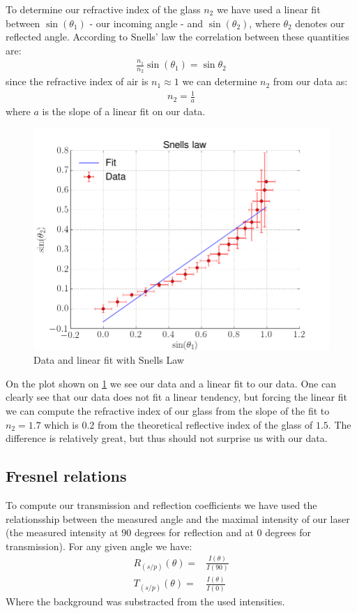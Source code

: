 To determine our refractive index of the glass $n_2$ we have used a linear fit between $\sin(\theta_1)$ - our incoming angle - and $\sin(\theta_2)$, where $\theta_2$ denotes our reflected angle. According to Snells' law the correlation between these quantities are:
%
\begin{align}
\frac{n_1}{n_2}\sin(\theta_1)=\sin{\theta_2}
\end{align}
%
since the refractive index of air is $n_1 \approx 1$ we can determine $n_2$ from our data as:
%
\begin{align}
n_2=\frac{1}{a}
\end{align}
%
where $a$ is the slope of a linear fit on our data. 
\begin{figure}[h!]
    \centering
    \includegraphics[width=\columnwidth]{snell}
    \caption{Data and linear fit with Snells Law}
    \label{fig:snell}
\end{figure}
\noindent
On the plot shown on \cref{fig:snell} we see our data and a linear fit to our data. One can clearly see that our data does not fit a linear tendency, but forcing the linear fit we can compute the refractive index of our glass from the slope of the fit to $n_2=1.7$ which is $0.2$ from the theoretical reflective index of the glass of $1.5$. The difference is relatively great, but thus should not surprise us with our data. 

\subsection{Fresnel relations}
To compute our transmission and reflection coefficients we have used the relationsship between the measured angle and the maximal intensity of our laser (the measured intensity at $90$ degrees for reflection and at $0$ degrees for transmission). For any given angle we have:
%
\begin{align}
    R_{(s/p)}(\theta)=&\frac{I(\theta)}{I(90)} \\
    T_{(s/p)}(\theta)=&\frac{I(\theta)}{I(0)}
\end{align}
%
Where the background was substracted from the used intensities. 


